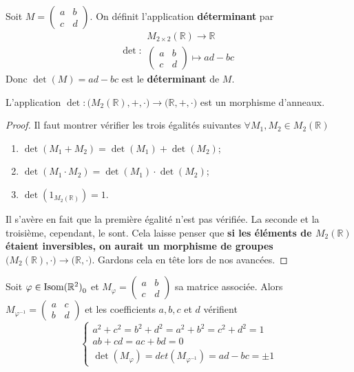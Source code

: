 \documentclass{book}
\numberwithin{equation}{section}
\renewcommand{\phi}{\varphi}
\providecommand{\plan}{{\mathbb R^2}}
\providecommand{\MR}{{M_2(\mathbb R)}}
\providecommand{\isom}{{\textnormal{Isom}(\plan)}}
\providecommand{\isomo}{{\isom_0}}
\begin{document}
\begin{defn}
	Soit $M = \left(\begin{smallmatrix}
		a & b\\
		c & d
	\end{smallmatrix}\right)$. On définit l'application \textbf{déterminant} par
	\begin{equation*}
		\det: \begin{array}{l}
			M_{2\times2}(\mathbb R) \to \mathbb R\\
			\left(\begin{smallmatrix}
				a & b\\
				c & d
			\end{smallmatrix}\right) \mapsto ad-bc
		\end{array}
	\end{equation*}
	Donc $\det(M) = ad-bc$ est le \textbf{déterminant} de $M$.
\end{defn}

\begin{lemme}[FAUX]
	L'application $\det : \bigl(\MR, +, \cdot\bigr) \to \bigl(\mathbb R, +, \cdot\bigr)$ est un morphisme d'anneaux.
\end{lemme}

\begin{proof}
	Il faut montrer vérifier les trois égalités suivantes $\forall M_1, M_2 \in \MR$
	\begin{enumerate}
		\item $\det(M_1 + M_2) = \det(M_1) + \det(M_2)$;
		\item $\det(M_1 \cdot M_2) = \det(M_1) \cdot \det(M_2)$;
		\item $\det(1_\MR) = 1$.
	\end{enumerate}
	Il s'avère en fait que la première égalité n'est pas vérifiée. La seconde et la troisième, cependant, le sont. Cela laisse penser que \textbf{si les éléments de $\MR$ étaient inversibles, on aurait un morphisme de groupes} $\bigl(\MR, \cdot\bigr) \to \bigl(\mathbb R, \cdot\bigr)$. Gardons cela en tête lors de nos avancées.
\end{proof}

\begin{thm}
	Soit $\phi \in \isomo$ et $M_\phi = \left(\begin{smallmatrix} a&b\\c&d \end{smallmatrix}\right)$ sa matrice associée. Alors $M_{\phi^{-1}} = \left(\begin{smallmatrix} a&c\\b&d \end{smallmatrix}\right)$ et les coefficients $a, b, c$ et $d$ vérifient
	\begin{equation*}
		\begin{cases}
			a^2 + c^2 = b^2 + d^2 = a^2 + b^2 = c^2 + d^2 = 1\\
			ab + cd = ac + bd = 0\\
			\det(M_\phi) = det(M_{\phi^{-1}}) = ad - bc = \pm 1
		\end{cases}
	\end{equation*}
\end{thm}
\end{document}
